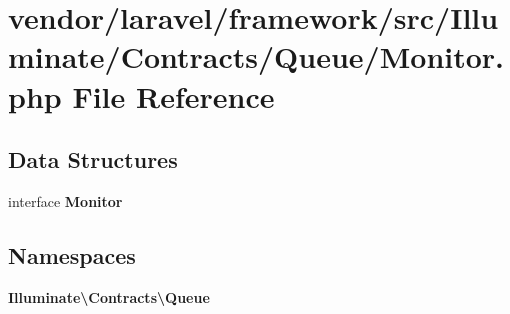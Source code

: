 \section{vendor/laravel/framework/src/\+Illuminate/\+Contracts/\+Queue/\+Monitor.php File Reference}
\label{_monitor_8php}
\subsection*{Data Structures}
\begin{DoxyCompactItemize}
\item 
interface {\bf Monitor}
\end{DoxyCompactItemize}
\subsection*{Namespaces}
\begin{DoxyCompactItemize}
\item 
 {\bf Illuminate\textbackslash{}\+Contracts\textbackslash{}\+Queue}
\end{DoxyCompactItemize}
